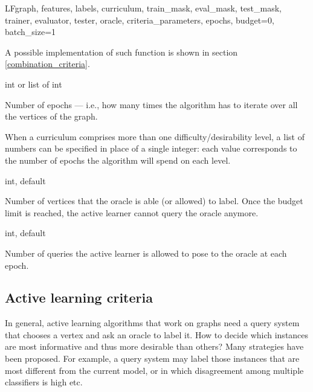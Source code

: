 \begin{independentfunctiondoc}{LF}{graph, features, labels, curriculum, train\_mask, eval\_mask, test\_mask, trainer, evaluator, tester, oracle, criteria\_parameters, epochs, budget=0, batch\_size=1}
\begin{functionparameters}
                    A possible implementation of such function is shown in section \ref{combination_criteria}.
                    \item[epochs] int or list of int
                    
                    Number of epochs --- i.e., how many times the algorithm has to iterate over all the vertices of the graph.
                    
                    When a curriculum comprises more than one difficulty/desirability level, a list of numbers can be specified in place of a single integer: each value corresponds to the number of epochs the algorithm will spend on each level.
                    \item[budget] int, default 
                    
                    Number of vertices that the oracle is able (or allowed) to label. Once the budget limit is reached, the active learner cannot query the oracle anymore.
                    \item[batch\_size] int, default 
                    
                    Number of queries the active learner is allowed to pose to the oracle at each epoch.
                \end{functionparameters}
                
                \begin{functionoutput}
                \end{functionoutput}
            \end{independentfunctiondoc}
        \subsection{Active learning criteria}\label{active_learning_criteria}
            In general, active learning algorithms that work on graphs need a query system that chooses a vertex and ask an oracle to label it. How to decide which instances are most informative and thus more desirable than others? Many strategies have been proposed. For example, a query system may label those instances that are most different from the current model, or in which disagreement among multiple classifiers is high etc.
            
